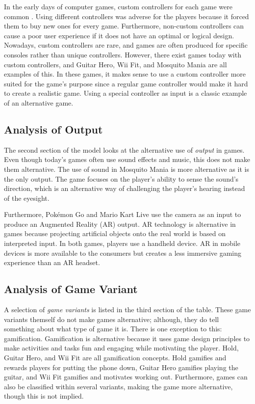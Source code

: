 In the early days of computer games, custom controllers for each game were common \citep{overmars_brief_2012}. Using different controllers was adverse for the players because it forced them to buy new ones for every game. Furthermore, non-custom controllers can cause a poor user experience if it does not have an optimal or logical design. Nowadays, custom controllers are rare, and games are often produced for specific consoles rather than unique controllers. However, there exist games today with custom controllers, and Guitar Hero, Wii Fit, and Mosquito Mania are all examples of this. In these games, it makes sense to use a custom controller more suited for the game's purpose since a regular game controller would make it hard to create a realistic game. Using a special controller as input is a classic example of an alternative game.

\subsection{Analysis of Output}
The second section of the model looks at the alternative use of \textit{output} in games. Even though today’s games often use sound effects and music, this does not make them alternative. The use of sound in Mosquito Mania is more alternative as it is the only output. The game focuses on the player's ability to sense the sound's direction, which is an alternative way of challenging the player's hearing instead of the eyesight.

Furthermore, Pokémon Go and Mario Kart Live use the camera as an input to produce an Augmented Reality (AR) output. AR technology is alternative in games because projecting artificial objects onto the real world is based on interpreted input. In both games, players use a handheld device. AR in mobile devices is more available to the consumers but creates a less immersive gaming experience than an AR headset.

\subsection{Analysis of Game Variant}
A selection of \textit{game variants} is listed in the third section of the table. These game variants themself do not make games alternative; although, they do tell something about what type of game it is. There is one exception to this: gamification. Gamification is alternative because it uses game design principles to make activities and tasks fun and engaging while motivating the player. Hold, Guitar Hero, and Wii Fit are all gamification concepts. Hold gamifies and rewards players for putting the phone down, Guitar Hero gamifies playing the guitar, and Wii Fit gamifies and motivates working out. Furthermore, games can also be classified within several variants, making the game more alternative, though this is not implied.

